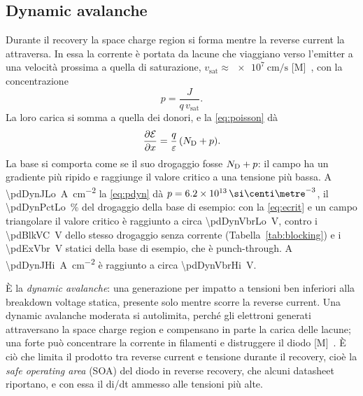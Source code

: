 \documentclass[10pt,a4paper]{scrartcl}
\let\newcommand\pdvaluedefine
\newcommand{\Ef}{\mathcal{E}}                 %
\newcommand{\ND}{N_\mathrm{D}}
\newcommand{\Pp}{p\textsuperscript{+}}
\newcommand{\cmc}{\si{\centi\metre^{-3}}}
\newcommand{\dpar}[2]{\frac{\partial #1}{\partial #2}}
\begin{document}
\subsection{Dynamic avalanche}
\label{sec:dynaval}
Durante il recovery la space charge region si forma mentre la reverse current la attraversa. In essa la corrente è portata da lacune che viaggiano verso l'emitter \Pp{} a una velocità prossima a quella di saturazione, $v_\mathrm{sat} \approx \SI{e7}{\centi\metre\per\second}$ [M]~\cite{sze}, con la concentrazione
\begin{equation}
p = \frac{J}{q\,v_\mathrm{sat}} .
\label{eq:pdyn}
\end{equation}
La loro carica si somma a quella dei donori, e la \eqref{eq:poisson} dà
\begin{equation}
\dpar{\Ef}{x} = \frac{q}{\varepsilon}\,(\ND + p) .
\label{eq:dynfield}
\end{equation}
La base si comporta come se il suo drogaggio fosse $\ND + p$: il campo ha un gradiente più ripido e raggiunge il valore critico a una tensione più bassa. A \SI{\pdDynJLo}{\ampere\per\centi\metre\squared} la \eqref{eq:pdyn} dà $p = \pdDynPLo\,\cmc$, il \SI{\pdDynPctLo}{\percent} del drogaggio della base di esempio: con la \eqref{eq:ecrit} e un campo triangolare il valore critico è raggiunto a circa \SI{\pdDynVbrLo}{\volt}, contro i \SI{\pdBlkVC}{\volt} dello stesso drogaggio senza corrente (Tabella~\ref{tab:blocking}) e i \SI{\pdExVbr}{\volt} statici della base di esempio, che è punch-through. A \SI{\pdDynJHi}{\ampere\per\centi\metre\squared} è raggiunto a circa \SI{\pdDynVbrHi}{\volt}.

È la \emph{dynamic avalanche}: una generazione per impatto a tensioni ben inferiori alla breakdown voltage statica, presente solo mentre scorre la reverse current. Una dynamic avalanche moderata si autolimita, perché gli elettroni generati attraversano la space charge region e compensano in parte la carica delle lacune; una forte può concentrare la corrente in filamenti e distruggere il diodo [M]~\cite{lutz}. È ciò che limita il prodotto tra reverse current e tensione durante il recovery, cioè la \emph{safe operating area} (SOA) del diodo in reverse recovery, che alcuni datasheet riportano, e con essa il di/dt ammesso alle tensioni più alte.
\end{document}
